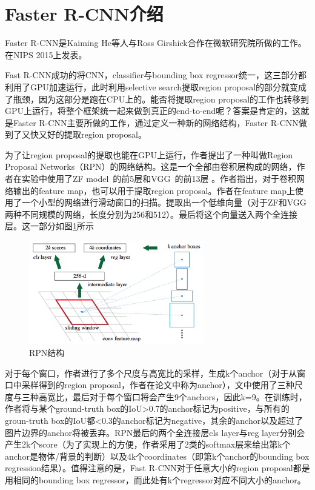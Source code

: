 \documentclass[10pt,twocolumn,letterpaper]{article}
\begin{document}
\section{Faster R-CNN介绍}
Faster R-CNN是Kaiming He等人与Ross Girshick合作在微软研究院所做的工作。在NIPS 2015上发表。

Fast R-CNN成功的将CNN，classifier与bounding box regressor统一，这三部分都利用了GPU加速运行，此时利用selective search提取region proposal的部分就变成了瓶颈，因为这部分是跑在CPU上的。能否将提取region proposal的工作也转移到GPU上运行，将整个框架统一起来做到真正的end-to-end呢？答案是肯定的，这就是Faster R-CNN主要所做的工作，通过定义一种新的网络结构，Faster R-CNN做到了又快又好的提取region proposal。

为了让region proposal的提取也能在GPU上运行，作者提出了一种叫做Region Proposal Networks（RPN）的网络结构。这是一个全部由卷积层构成的网络，作者在实验中使用了ZF model~\cite{Zeiler:2014fr}的前5层和VGG~\cite{Simonyan14c}的前13层 。作者指出，对于卷积网络输出的feature map，也可以用于提取region proposal。作者在feature map上使用了一个小型的网络进行滑动窗口的扫描。提取出一个低维向量（对于ZF和VGG两种不同规模的网络，长度分别为256和512）。最后将这个向量送入两个全连接层。这一部分如图\ref{fig:rpn}所示
\begin{figure}[htbp] %
   \centering
   \includegraphics[width=3in]{rpn.png} 
   \caption{RPN结构}
   \label{fig:rpn}
\end{figure}
对于每个窗口，作者进行了多个尺度与高宽比的采样，生成k个anchor（对于从窗口中采样得到的region proposal，作者在论文中称为anchor），文中使用了三种尺度与三种高宽比，最后对于每个窗口将会产生9个anchors，因此k=9。在训练时，作者将与某个ground-truth box的IoU>0.7的anchor标记为positive，与所有的groun-truth box的IoU都<0.3的anchor标记为negative，其余的anchor以及超过了图片边界的anchor将被丢弃。RPN最后的两个全连接层cls layer与reg layer分别会产生2k个score（为了实现上的方便，作者采用了2类的softmax层来给出第k个anchor是物体/背景的判断）以及4k个coordinates（即第k个anchor的bounding box regression结果）。值得注意的是，Fast R-CNN对于任意大小的region proposal都是用相同的bounding box regressor，而此处有k个regressor对应不同大小的anchor。
\end{document}
